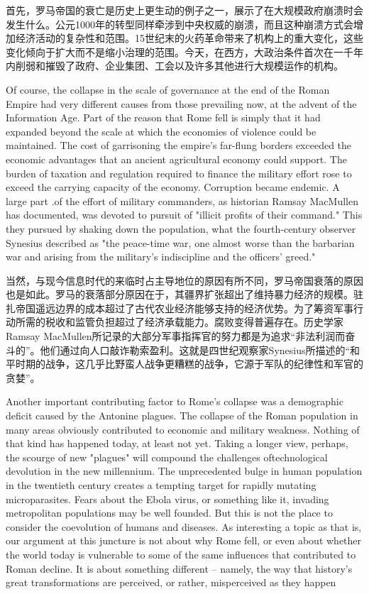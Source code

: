 \begin{Parallel}{97mm}{45mm}
  \ParallelRText
  {首先，罗马帝国的衰亡是历史上更生动的例子之一，展示了在大规模政府崩溃时会发生什么。公元1000年的转型同样牵涉到中央权威的崩溃，而且这种崩溃方式会增加经济活动的复杂性和范围。15世纪末的火药革命带来了机构上的重大变化，这些变化倾向于扩大而不是缩小治理的范围。今天，在西方，大政治条件首次在一千年内削弱和摧毁了政府、企业集团、工会以及许多其他进行大规模运作的机构。}
  \ParallelPar



  \ParallelLText
  {Of course, the collapse in the scale of governance at the end of the Roman Empire had very different causes from those prevailing now, at the advent of the Information Age. Part of the reason that Rome fell is simply that it had expanded beyond the scale at which the economies of violence could be maintained. The cost of garrisoning the empire's far-flung borders exceeded the economic advantages that an ancient agricultural economy could support. The burden of taxation and regulation required to finance the military effort rose to exceed the carrying capacity of the economy. Corruption became endemic. A large part .of the effort of military commanders, as historian Ramsay MacMullen has documented, was devoted to pursuit of "illicit profits of their command." This they pursued by shaking down the population, what the fourth-century observer Synesius described as "the peace-time war, one almost worse than the barbarian war and arising from the military's indiscipline and the officers' greed." }
  
  \ParallelRText
  {当然，与现今信息时代的来临时占主导地位的原因有所不同，罗马帝国衰落的原因也是如此。罗马的衰落部分原因在于，其疆界扩张超出了维持暴力经济的规模。驻扎帝国遥远边界的成本超过了古代农业经济能够支持的经济优势。为了筹资军事行动所需的税收和监管负担超过了经济承载能力。腐败变得普遍存在。历史学家Ramsay MacMullen所记录的大部分军事指挥官的努力都是为追求“非法利润而奋斗的”。他们通过向人口敲诈勒索盈利。这就是四世纪观察家Synesius所描述的“和平时期的战争，这几乎比野蛮人战争更糟糕的战争，它源于军队的纪律性和军官的贪婪”。}
  \ParallelPar



  \ParallelLText
  {Another important contributing factor to Rome's collapse was a demographic deficit caused by the Antonine plagues. The collapse of the Roman population in many areas obviously contributed to economic and military weakness. Nothing of that kind has happened today, at least not yet. Taking a longer view, perhaps, the scourge of new "plagues" will compound the challenges oftechnological devolution in the new millennium. The unprecedented bulge in human population in the twentieth century creates a tempting target for rapidly mutating microparasites. Fears about the Ebola virus, or something like it, invading metropolitan populations may be well founded. But this is not the place to consider the coevolution of humans and diseases. As interesting a topic as that is, our argument at this juncture is not about why Rome fell, or even about whether the world today is vulnerable to some of the same influences that contributed to Roman decline. It is about something different -- namely, the way that history's great transformations are perceived, or rather, misperceived as they happen}
  

\end{Parallel}
